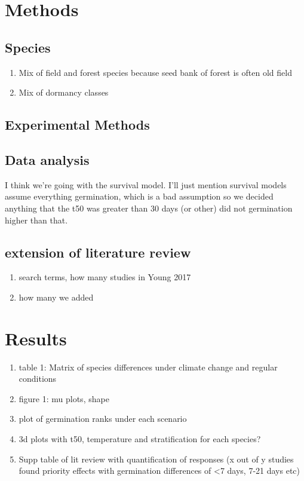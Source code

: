 \documentclass[11pt]{article}\usepackage[]{graphicx}\usepackage[]{color}
\begin{document}
\section*{Methods}
\subsection*{Species}
\begin{enumerate}
\item Mix of field and forest species because seed bank of forest is often old field
\item Mix of dormancy classes
\end{enumerate}
\subsection{Experimental Methods}
\subsection{Data analysis}
I think we're going with the survival model. I'll just mention survival models assume everything germination, which is a bad assumption so we decided anything that the t50 was greater than 30 days (or other) did not germination higher than that.

\subsection{extension of literature review}
\begin{enumerate}
\item search terms, how many studies in Young 2017
\item how many we added
\end{enumerate}

\section*{Results}
\begin{enumerate}
\item table 1: Matrix of species differences under climate change and regular conditions
\item figure 1: mu plots, shape
\item plot of germination ranks under each scenario
\item 3d plots with t50, temperature and stratification for each species?
\item Supp table of lit review with quantification of responses (x out of y studies found priority effects with germination differences of <7 days, 7-21 days etc)
\end{enumerate}
\end{document}

